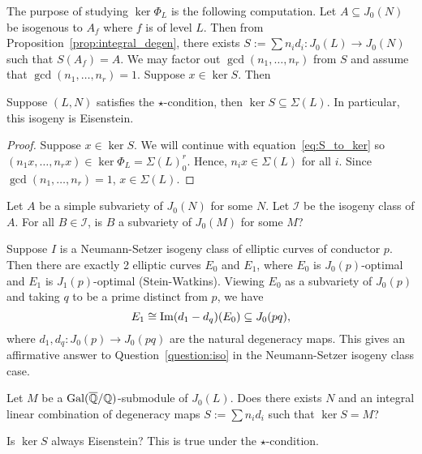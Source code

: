 \documentclass[11pt, proquest]{uwthesis}
\begin{document}
The purpose of studying $\ker\Phi_L$ is the following computation. Let
$A\subseteq J_0(N)$ be isogenous to $A_f$ where $f$ is of level $L$. Then from
Proposition~\ref{prop:integral_degen}, there exists $S:=\sum n_i d_i:J_0(L)\to
J_0(N)$ such that $S(A_f)=A$. We may factor out $\gcd(n_1,\ldots, n_r)$ from
$S$ and assume that $\gcd(n_1, \ldots,n_r)=1$. Suppose $x\in \ker S$. Then 

\begin{proposition}
    \label{prop:star_eisenstein}
    Suppose $(L, N)$ satisfies the $\star$-condition, then $\ker S\subseteq
    \Sigma(L)$. In particular, this isogeny is Eisenstein.
\end{proposition}
\begin{proof}
    Suppose $x\in \ker S$. We will continue with equation~\eqref{eq:S_to_ker}
    so $(n_1 x, \ldots, n_r x)\in \ker\Phi_L = \Sigma(L)_0 ^r$. Hence, $n_i x\in
    \Sigma(L)$ for all $i$. Since $\gcd(n_1,\ldots,n_r)=1$, $x\in \Sigma(L)$.
\end{proof}

\begin{question}
    \label{question:iso}
    Let $A$ be a simple subvariety of $J_0(N)$ for some $N$. Let $\mathcal{I}$
    be the isogeny class of $A$. For all $B\in \mathcal{I}$, is $B$ a
    subvariety of $J_0(M)$ for some $M$?
\end{question}

\begin{example}
    Suppose $I$ is a Neumann-Setzer isogeny class of elliptic curves of
    conductor $p$. Then there are exactly 2 elliptic curves $E_0$ and $E_1$,
    where $E_0$ is $J_0(p)$-optimal and $E_1$ is $J_1(p)$-optimal
    (Stein-Watkins). Viewing $E_0$ as a subvariety of $J_0(p)$ and taking $q$
    to be a prime distinct from $p$, we have
    \[
        E_1 \cong \operatorname{Im} (d_1-d_q)(E_0)\subseteq J_0(pq),
    \]
    where $d_1, d_q:J_0(p)\to J_0(pq)$ are the natural degeneracy maps. This
    gives an affirmative answer to Question~\ref{question:iso} in the
    Neumann-Setzer isogeny class case.
\end{example}


\begin{question}
    Let $M$ be a $\operatorname{Gal}(\overline{\mathbb{Q}}/\mathbb{Q})$-submodule of $J_0(L)$. Does there exists
    $N$ and an integral linear combination of degeneracy maps $S:=\sum n_i d_i$
    such that $\ker S=M$?
\end{question}

\begin{question}
    Is $\ker S$ always Eisenstein? This is true under the $\star$-condition.
\end{question}
\end{document}
